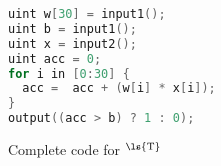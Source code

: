 \begin{figure}
\begin{lstlisting}[language=C]
uint w[30] = input1();
uint b = input1();
uint x = input2();
uint acc = 0;
for i in [0:30] {
  acc =  acc + (w[i] * x[i]);
}
output((acc > b) ? 1 : 0);
\end{lstlisting}
\caption{Complete \tool code for $^{\text{\ls{T}}}$}
\label{fig:ex-sml}
\end{figure}

